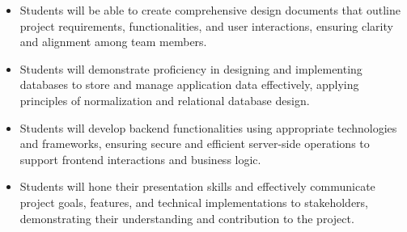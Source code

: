 \begin{itemize}
    \item Students will be able to create comprehensive design documents that outline project requirements, functionalities, and user interactions, ensuring clarity and alignment among team members.
    \item Students will demonstrate proficiency in designing and implementing databases to store and manage application data effectively, applying principles of normalization and relational database design.
    \item Students will develop backend functionalities using appropriate technologies and frameworks, ensuring secure and efficient server-side operations to support frontend interactions and business logic.
    \item Students will hone their presentation skills and effectively communicate project goals, features, and technical implementations to stakeholders, demonstrating their understanding and contribution to the project.
\end{itemize}

